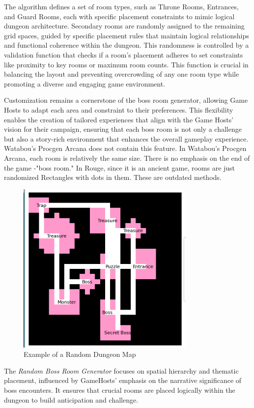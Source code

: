 \documentclass[10pt,twocolumn]{article}
\begin{document}
The algorithm defines a set of room types, such as Throne Rooms, Entrances, and Guard Rooms, each with specific placement constraints to mimic logical dungeon architecture. Secondary rooms are randomly assigned to the remaining grid spaces, guided by specific placement rules that maintain logical relationships and functional coherence within the dungeon. This randomness is controlled by a validation function that checks if a room's placement adheres to set constraints like proximity to key rooms or maximum room counts. This function is crucial in balancing the layout and preventing overcrowding of any one room type while promoting a diverse and engaging game environment.

Customization remains a cornerstone of the boss room generator, allowing Game Hosts to adapt each area and constraint to their preferences. This flexibility enables the creation of tailored experiences that align with the Game Hosts' vision for their campaign, ensuring that each boss room is not only a challenge but also a story-rich environment that enhances the overall gameplay experience. Watabou's Procgen Arcana does not contain this feature. In Watabou's Procgen Arcana, each room is relatively the same size. There is no emphasis on the  end of the game -"boss room." In Rouge, since it is an ancient game, rooms are just randomized Rectangles with dots in them. These are outdated methods.

\begin{figure}[h]
\centering
\includegraphics[width=0.5\linewidth]{mymap.png}
\caption{Example of a Random Dungeon Map}
\label{fig:dungeon-map}
\end{figure}

The \textit{Random Boss Room Generator} focuses on spatial hierarchy and thematic placement, influenced by GameHosts' emphasis on the narrative significance of boss encounters. It ensures that crucial rooms are placed logically within the dungeon to build anticipation and challenge.
\end{document}
